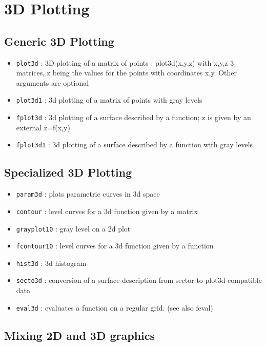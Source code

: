 

\section{3D Plotting}
\subsection{Generic 3D Plotting}
%
\begin{itemize}
	\item  \verb+plot3d+ : 3D plotting of a matrix of points : plot3d(x,y,z) with x,y,z 3 matrices, z being the values for the points with coordinates x,y. Other
arguments are optional
	\item   \verb+plot3d1+ : 3d plotting	of a matrix of points with gray levels
	\item   \verb+fplot3d+ : 3d plotting	of a surface described by a function; z is given by an external z=f(x,y)
	\item   \verb+fplot3d1+ : 3d	plotting of a surface described	by a function with gray	levels
\end{itemize}
%
 
\subsection{Specialized 3D Plotting}
\begin{itemize}
	\item \verb+param3d+	: plots parametric curves in 3d space
	\item \verb+contour+	: level curves for a 3d function given by a 
matrix
	\item \verb+grayplot10+ : gray level on a 2d plot
	\item \verb+fcontour10+ : level curves for a 3d function given by a 
function
	\item \verb+hist3d+	: 3d histogram
	\item \verb+secto3d+	: conversion of a surface description from 
sector to plot3d compatible data
	\item \verb+eval3d+	: evaluates a function on a regular grid. 
(see also feval)
\end{itemize}
%
 

\subsection{Mixing 2D and 3D graphics}

